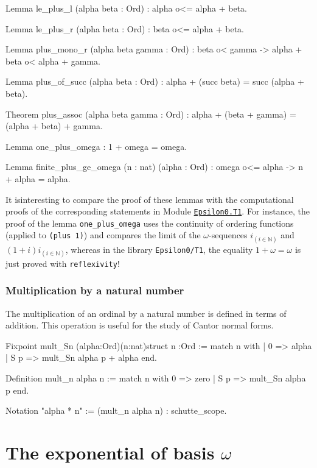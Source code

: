 {\begin{Coqsrc}
Lemma le_plus_l (alpha beta : Ord) : alpha o<= alpha + beta.

Lemma le_plus_r (alpha beta : Ord) :  beta o<= alpha + beta.

Lemma plus_mono_r (alpha beta gamma : Ord) : 
    beta o< gamma -> alpha + beta o< alpha + gamma.

Lemma plus_of_succ (alpha beta : Ord) :
    alpha + (succ beta) = succ (alpha + beta).

Theorem plus_assoc (alpha beta gamma : Ord) :
  alpha + (beta + gamma) = (alpha + beta) + gamma.

Lemma one_plus_omega :  1 + omega = omega.

Lemma finite_plus_ge_omega (n : nat) (alpha : Ord) :
  omega o<= alpha -> n + alpha = alpha.
\end{Coqsrc} 


It isinteresting to compare the proof of these lemmas with the 
computational proofs of the corresponding statements in Module
\href{../src/html/hydras.Epsilon0.T1.html}%
{\texttt{Epsilon0.T1}}. 
For instance, the proof of the lemma 
\texttt{one\_plus\_omega} uses the continuity of ordering functions (applied to  \texttt{(plus 1)}) and compares the limit of the $\omega$-sequences $i_{(i \in \mathbb{N})}$ and
$(1+i)i_{(i \in \mathbb{N})}$, whereas in the library  \texttt{Epsilon0/T1}, the equality 
$1+\omega=\omega$ is just proved with \texttt{reflexivity}!



\subsubsection{Multiplication by a natural number}

The multiplication of an ordinal by a natural number is defined in terms of addition.
This operation is useful for the study of Cantor normal forms.

\begin{Coqsrc}
Fixpoint mult_Sn (alpha:Ord)(n:nat){struct n} :Ord :=
 match n with 
            | 0 => alpha
            | S p => mult_Sn alpha p + alpha
 end.

Definition mult_n alpha n :=
  match n with
      0 => zero
    | S p => mult_Sn alpha p
  end.

Notation "alpha * n" := (mult_n alpha n) : schutte_scope.
\end{Coqsrc}

\section{The exponential of basis \texorpdfstring{$\omega$}{omega}}

}
